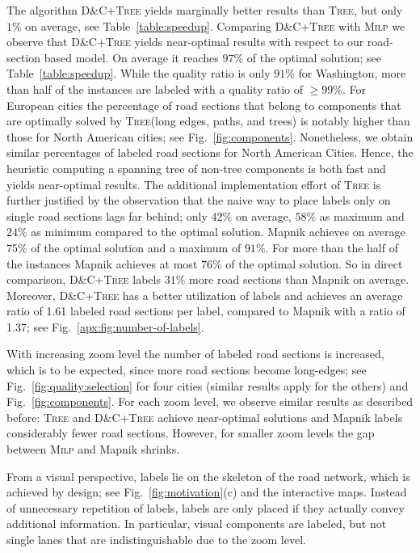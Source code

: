 \documentclass[a4paper,11pt]{article}
\newcommand{\TreeAlgo}{\textsc{Tree}\xspace}
\newcommand{\ILPAlgo}{\textsc{Milp}\xspace}
\newcommand{\Shredder}{\textsc{D\&C}}
\begin{document}
The algorithm \Shredder+\TreeAlgo yields marginally better results
than \TreeAlgo, but only $1\%$ on average, see
Table~\ref{table:speedup}. Comparing \Shredder+\TreeAlgo with \ILPAlgo
we observe that \Shredder+\TreeAlgo yields near-optimal results with
respect to our road-section based model.  On average it reaches $97\%$
of the optimal solution; see Table~\ref{table:speedup}. While the
quality ratio is only $91\%$ for Washington, more than half of the
instances are labeled with a quality ratio of $\ge 99\%$.  For
European cities the percentage of road sections that belong to
components that are optimally solved by \TreeAlgo (long edges, paths,
and trees) is notably higher than those for North American cities; see
Fig.~\ref{fig:components}. Nonetheless, we obtain similar percentages
of labeled road sections for North American Cities. Hence, the
heuristic computing a spanning tree of non-tree components is both
fast and yields near-optimal results. The additional implementation
effort of \TreeAlgo is further justified by the observation that the
naive way to place labels only on single road sections lags far
behind; only $42\%$ on average, $58\%$ as maximum and $24\%$ as
minimum compared to the optimal solution.  Mapnik achieves on average
$75\%$ of the optimal solution and a maximum of $91\%$. For more than
the half of the instances Mapnik achieves at most $76\%$ of the
optimal solution. So in direct comparison, \Shredder+\TreeAlgo labels
$31\%$ more road sections than Mapnik on average. 
Moreover, \Shredder+\TreeAlgo has a better utilization of labels and achieves an average ratio of 1.61 labeled road sections per label, compared to Mapnik with a ratio of 1.37; see Fig.~\ref{apx:fig:number-of-labels}.






With increasing zoom level the number of
labeled road sections is increased, which is to be expected, since
more road sections become long-edges; see
Fig.~\ref{fig:quality:selection} for four cities (similar results apply for the others) and
Fig.~\ref{fig:components}. For each zoom level, we observe
similar results as described before: \TreeAlgo and \Shredder+\TreeAlgo
achieve near-optimal solutions and
Mapnik labels considerably fewer road sections. However, for smaller zoom
levels the gap between \ILPAlgo and Mapnik shrinks. 


From a visual perspective, labels lie on the skeleton of the road
network, which is achieved by design; see Fig.~\ref{fig:motivation}(c)
and the interactive maps. Instead of unnecessary repetition of labels,
labels are only placed if they actually convey additional
information. In particular, visual components are labeled, but not
single lanes that are indistinguishable due to the zoom level.
\end{document}
